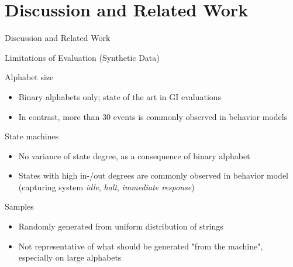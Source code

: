 \section{Discussion and Related Work}

\begin{frame}{Discussion and Related Work}
\end{frame}

\begin{frame}{Limitations of Evaluation (Synthetic Data)}

  \begin{block}{Alphabet size}
    \begin{itemize}
      \item Binary alphabets only; state of the art in GI evaluations
      \item In contrast, more than 30 events is commonly observed in behavior models
    \end{itemize}
  \end{block}

  \begin{block}{State machines}
    \begin{itemize}
      \item No variance of state degree, as a consequence of binary alphabet 
      \item States with high in-/out degrees are commonly observed in behavior model 
            (capturing system \emph{idle}, \emph{halt}, \emph{immediate response})
    \end{itemize}
  \end{block}

  \begin{block}{Samples}
    \begin{itemize}
      \item Randomly generated from uniform distribution of strings
      \item Not representative of what should be generated "from the machine", especially 
            on large alphabets
    \end{itemize}
  \end{block}

\end{frame}

